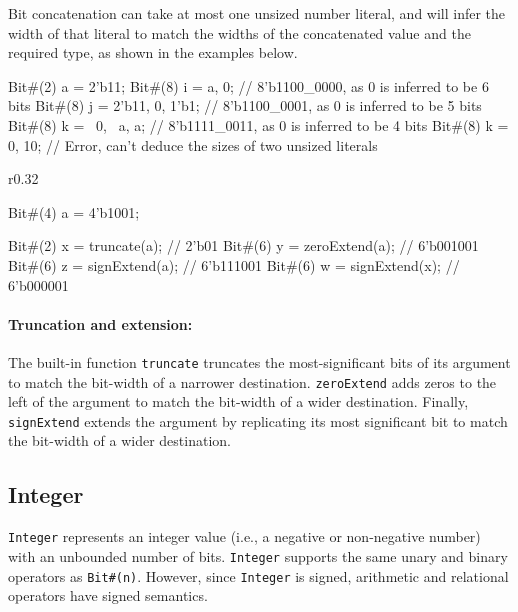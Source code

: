 Bit concatenation can take at most one unsized number literal,
and will infer the width of that literal to match the widths
of the concatenated value and the required type, as shown in the examples below.

\begin{mscode}
Bit#(2) a = 2'b11;
Bit#(8) i = {a, 0};            // 8'b1100_0000, as 0 is inferred to be 6 bits
Bit#(8) j = {2'b11, 0, 1'b1};  // 8'b1100_0001, as 0 is inferred to be 5 bits
Bit#(8) k = {~0, ~a, a};       // 8'b1111_0011, as 0 is inferred to be 4 bits
Bit#(8) k = {0, 10};           // Error, can't deduce the sizes of two unsized literals
\end{mscode}

\begin{wrapfigure}{r}{0.32\columnwidth}
\vspace{-2em}
\begin{mscode}
Bit#(4) a = 4'b1001;

Bit#(2) x = truncate(a);
            // 2'b01
Bit#(6) y = zeroExtend(a);
            // 6'b001001
Bit#(6) z = signExtend(a);
            // 6'b111001
Bit#(6) w = signExtend(x);
            // 6'b000001
\end{mscode}
\vspace{-2.5em}
\end{wrapfigure}

\paragraph{Truncation and extension:}
The built-in function \verb|truncate| truncates the most-significant bits of its argument to match the bit-width of a narrower destination. \verb|zeroExtend| adds zeros to the left of the argument to match the bit-width of a wider destination.
Finally, \verb|signExtend| extends the argument by replicating its most significant bit to match the bit-width of a wider destination.

\subsection{Integer}
\label{sec:integer}

\verb|Integer| represents an integer value (i.e., a negative or non-negative number) with an unbounded number of bits.
\verb|Integer| supports the same unary and binary
operators as \verb|Bit#(n)|. However, since \verb|Integer| is signed,
arithmetic and relational operators have signed semantics.

